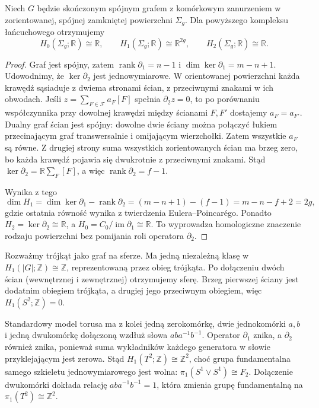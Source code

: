 \begin{twierdzenie}
\label{thm:tg-surface-homology}
Niech $G$ będzie skończonym spójnym grafem z komórkowym
zanurzeniem w zorientowanej, spójnej zamkniętej powierzchni
$\Sigma_g$. Dla powyższego kompleksu łańcuchowego
otrzymujemy
\[
H_0(\Sigma_g;\mathbb R)\cong\mathbb R,
\qquad H_1(\Sigma_g;\mathbb R)\cong\mathbb R^{2g},
\qquad H_2(\Sigma_g;\mathbb R)\cong\mathbb R.
\]
\end{twierdzenie}

\begin{proof}
Graf jest spójny, zatem $\operatorname{rank}\partial_1=n-1$
i $\dim\ker\partial_1=m-n+1$. Udowodnimy, że
$\ker\partial_2$ jest jednowymiarowe. W orientowanej
powierzchni każda krawędź sąsiaduje z dwiema stronami
ścian, z przeciwnymi znakami w ich obwodach. Jeśli
$z=\sum_{F\in\mathcal F}a_F[F]$ spełnia
$\partial_2z=0$, to po porównaniu współczynnika
przy dowolnej krawędzi między ścianami $F,F'$ dostajemy
$a_F=a_{F'}$. Dualny graf ścian jest spójny:
dowolne dwie ściany można połączyć łukiem przecinającym
graf transwersalnie i omijającym wierzchołki.
Zatem wszystkie $a_F$ są równe. Z drugiej strony
suma wszystkich zorientowanych ścian ma brzeg zero,
bo każda krawędź pojawia się dwukrotnie z przeciwnymi
znakami. Stąd
$\ker\partial_2=\mathbb R\sum_F[F]$, a więc
$\operatorname{rank}\partial_2=f-1$.

Wynika z tego
\[
\dim H_1=\dim\ker\partial_1-\operatorname{rank}\partial_2
=(m-n+1)-(f-1)=m-n-f+2=2g,
\]
gdzie ostatnia równość wynika z twierdzenia Eulera--Poincarégo.
Ponadto $H_2=\ker\partial_2\cong\mathbb R$,
a $H_0=C_0/\operatorname{im}\partial_1\cong\mathbb R$.
To wyprowadza homologiczne znaczenie rodzaju powierzchni
bez pomijania roli operatora $\partial_2$.
\end{proof}

\begin{przyklad}
Rozważmy trójkąt jako graf na sferze. Ma jedną niezależną
klasę w $H_1(|G|;\mathbb Z)\cong\mathbb Z$, reprezentowaną
przez obieg trójkąta. Po dołączeniu dwóch ścian
(wewnętrznej i zewnętrznej) otrzymujemy sferę.
Brzeg pierwszej ściany jest dodatnim obiegiem trójkąta,
a drugiej jego przeciwnym obiegiem, więc
$H_1(S^2;\mathbb Z)=0$.

Standardowy model torusa ma z kolei jedną zerokomórkę,
dwie jednokomórki $a,b$ i jedną dwukomórkę dołączoną
wzdłuż słowa $aba^{-1}b^{-1}$. Operator $\partial_1$ znika,
a $\partial_2$ również znika, ponieważ suma wykładników
każdego generatora w słowie przyklejającym jest zerowa.
Stąd $H_1(T^2;\mathbb Z)\cong\mathbb Z^2$, choć grupa
fundamentalna samego szkieletu jednowymiarowego jest
wolna: $\pi_1(S^1\vee S^1)\cong F_2$.
Dołączenie dwukomórki dokłada relację
$aba^{-1}b^{-1}=1$, która zmienia grupę fundamentalną
na $\pi_1(T^2)\cong\mathbb Z^2$.
\end{przyklad}

